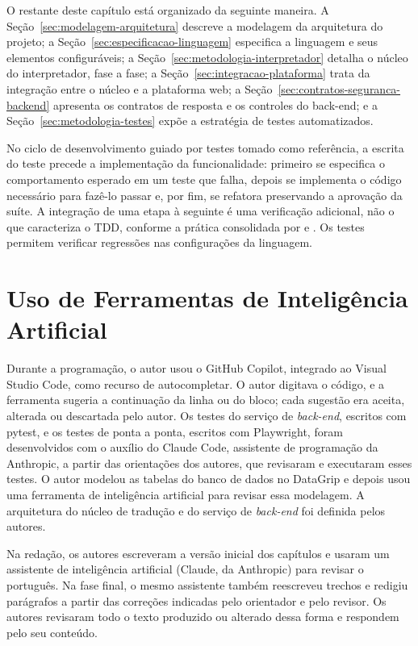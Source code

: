 O restante deste capítulo está organizado da seguinte maneira. A Seção~\ref{sec:modelagem-arquitetura} descreve a modelagem da arquitetura do projeto; a Seção~\ref{sec:especificacao-linguagem} especifica a linguagem e seus elementos configuráveis; a Seção~\ref{sec:metodologia-interpretador} detalha o núcleo do interpretador, fase a fase; a Seção~\ref{sec:integracao-plataforma} trata da integração entre o núcleo e a plataforma web; a Seção~\ref{sec:contratos-seguranca-backend} apresenta os contratos de resposta e os controles do back-end; e a Seção~\ref{sec:metodologia-testes} expõe a estratégia de testes automatizados.

No ciclo de desenvolvimento guiado por testes tomado como referência, a escrita do teste precede a implementação da funcionalidade: primeiro se especifica o comportamento esperado em um teste que falha, depois se implementa o código necessário para fazê-lo passar e, por fim, se refatora preservando a aprovação da suíte. A integração de uma etapa à seguinte é uma verificação adicional, não o que caracteriza o TDD, conforme a prática consolidada por  e . Os testes permitem verificar regressões nas configurações da linguagem.

\section{Uso de Ferramentas de Inteligência Artificial}
\label{sec:uso-ia}

Durante a programação, o autor usou o GitHub Copilot, integrado ao Visual Studio Code, como recurso de autocompletar. O autor digitava o código, e a ferramenta sugeria a continuação da linha ou do bloco; cada sugestão era aceita, alterada ou descartada pelo autor. Os testes do serviço de \textit{back-end}, escritos com pytest, e os testes de ponta a ponta, escritos com Playwright, foram desenvolvidos com o auxílio do Claude Code, assistente de programação da Anthropic, a partir das orientações dos autores, que revisaram e executaram esses testes. O autor modelou as tabelas do banco de dados no DataGrip e depois usou uma ferramenta de inteligência artificial para revisar essa modelagem. A arquitetura do núcleo de tradução e do serviço de \textit{back-end} foi definida pelos autores.

Na redação, os autores escreveram a versão inicial dos capítulos e usaram um assistente de inteligência artificial (Claude, da Anthropic) para revisar o português. Na fase final, o mesmo assistente também reescreveu trechos e redigiu parágrafos a partir das correções indicadas pelo orientador e pelo revisor. Os autores revisaram todo o texto produzido ou alterado dessa forma e respondem pelo seu conteúdo.

